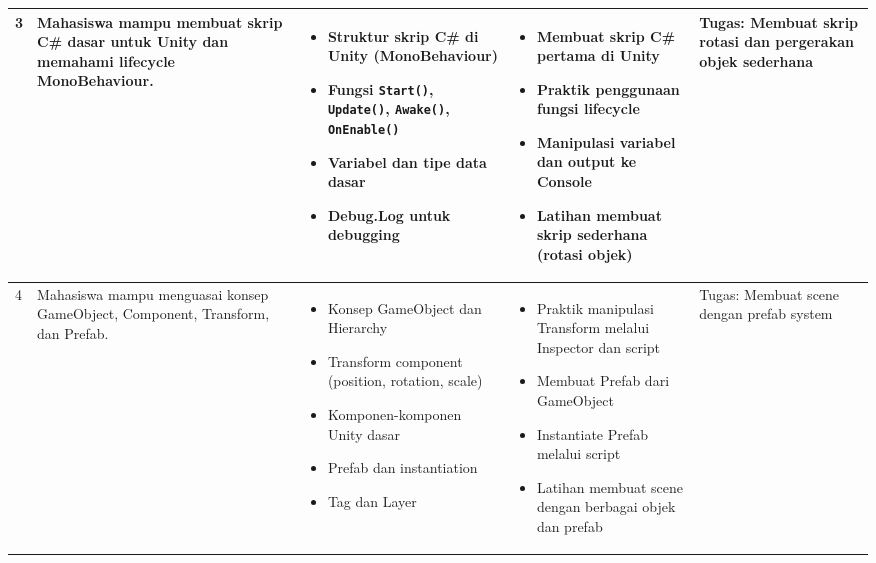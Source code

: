 \begin{longtable}{|p{0.8cm}|p{3.5cm}|p{4cm}|p{4cm}|p{2.5cm}|}
3 & Mahasiswa mampu membuat skrip C\# dasar untuk Unity dan memahami lifecycle MonoBehaviour. & 
\begin{itemize}[leftmargin=*,nosep]
\item Struktur skrip C\# di Unity (MonoBehaviour)
\item Fungsi \texttt{Start()}, \texttt{Update()}, \texttt{Awake()}, \texttt{OnEnable()}
\item Variabel dan tipe data dasar
\item Debug.Log untuk debugging
\end{itemize} & 
\begin{itemize}[leftmargin=*,nosep]
\item Membuat skrip C\# pertama di Unity
\item Praktik penggunaan fungsi lifecycle
\item Manipulasi variabel dan output ke Console
\item Latihan membuat skrip sederhana (rotasi objek)
\end{itemize} & 
Tugas: Membuat skrip rotasi dan pergerakan objek sederhana \\
\hline

4 & Mahasiswa mampu menguasai konsep GameObject, Component, Transform, dan Prefab. & 
\begin{itemize}[leftmargin=*,nosep]
\item Konsep GameObject dan Hierarchy
\item Transform component (position, rotation, scale)
\item Komponen-komponen Unity dasar
\item Prefab dan instantiation
\item Tag dan Layer
\end{itemize} & 
\begin{itemize}[leftmargin=*,nosep]
\item Praktik manipulasi Transform melalui Inspector dan script
\item Membuat Prefab dari GameObject
\item Instantiate Prefab melalui script
\item Latihan membuat scene dengan berbagai objek dan prefab
\end{itemize} & 
Tugas: Membuat scene dengan prefab system \\
\hline


\end{longtable}

